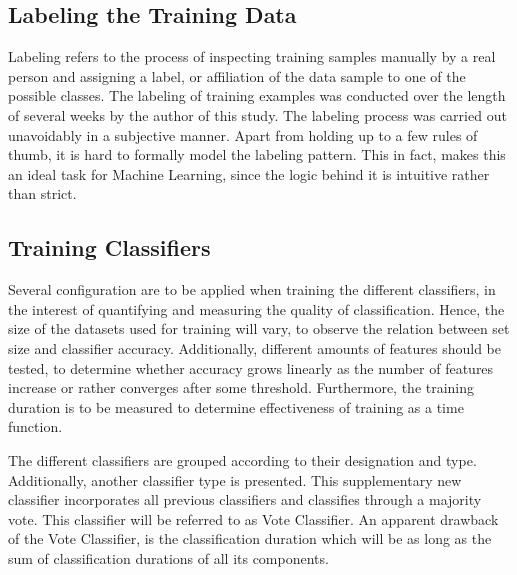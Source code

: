 	\subsection{Labeling the Training Data}
		Labeling refers to the process of inspecting training samples manually by a real person and assigning a label, or affiliation of the data sample to one of the possible classes. The labeling of training examples was conducted over the length of several weeks by the author of this study. The labeling process was carried out unavoidably in a subjective manner. Apart from holding up to a few rules of thumb, it is hard to formally model the labeling pattern. This in fact, makes this an ideal task for Machine Learning, since the logic behind it is intuitive rather than strict.
			
	\subsection{Training Classifiers}
		Several configuration are to be applied when training the different classifiers, in the interest of quantifying and measuring the quality of classification. Hence, the size of the datasets used for training will vary, to observe the relation between set size and classifier accuracy. Additionally, different amounts of features should be tested, to determine whether accuracy grows linearly as the number of features increase or rather converges after some threshold. Furthermore, the training duration is to be measured to determine effectiveness of training as a time function.
		
		\par
		
		The different classifiers are grouped according to their designation and type. Additionally, another classifier type is presented. This supplementary new classifier incorporates all previous classifiers and classifies through a majority vote. This classifier will be referred to as Vote Classifier. An apparent drawback of the Vote Classifier, is the classification duration which will be as long as the sum of classification durations of all its components.
		
		